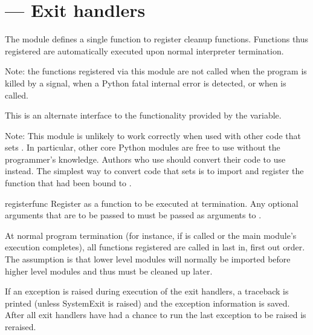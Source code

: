\section{ ---
         Exit handlers}



The  module defines a single function to register
cleanup functions.  Functions thus registered are automatically
executed upon normal interpreter termination.

Note: the functions registered via this module are not called when the program is killed by a
signal, when a Python fatal internal error is detected, or when
 is called.

This is an alternate interface to the functionality provided by the
 variable.

Note: This module is unlikely to work correctly when used with other code
that sets .  In particular, other core Python modules are
free to use  without the programmer's knowledge.  Authors who
use  should convert their code to use
 instead.  The simplest way to convert code that sets
 is to import  and register the function
that had been bound to .

\begin{funcdesc}{register}{func}
Register  as a function to be executed at termination.  Any
optional arguments that are to be passed to  must be passed
as arguments to .

At normal program termination (for instance, if
 is called or the main module's execution
completes), all functions registered are called in last in, first out
order.  The assumption is that lower level modules will normally be
imported before higher level modules and thus must be cleaned up
later.

If an exception is raised during execution of the exit handlers, a traceback
is printed (unless SystemExit is raised) and the exception information is
saved.  After all exit handlers have had a chance to run the last exception
to be raised is reraised.

\end{funcdesc}


